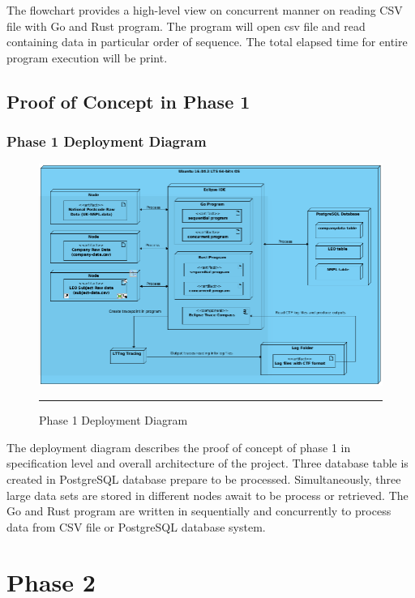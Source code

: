 The flowchart provides a high-level view on concurrent manner on reading CSV file with Go and Rust program. The program will open csv file and read containing data in particular order of sequence. The total elapsed time for entire program execution will be print. 

\subsection{Proof of Concept in Phase 1}

\subsubsection{Phase 1 Deployment Diagram}

\begin{figure}[H]
	\centering
	\includegraphics[width=1.0\textwidth]{Figure/dd-poc.png}
	\rule{35em}{0.5pt}
	\caption[Phase 1 Deployment Diagram]{Phase 1 Deployment Diagram}
\end{figure}

The deployment diagram describes the proof of concept of phase 1 in specification level and overall architecture of the project. Three database table is created in PostgreSQL database prepare to be processed. Simultaneously, three large data sets are stored in different nodes await to be process or retrieved. The Go and Rust program are written in sequentially and concurrently to process data from CSV file or PostgreSQL database system.

\section{Phase 2}


